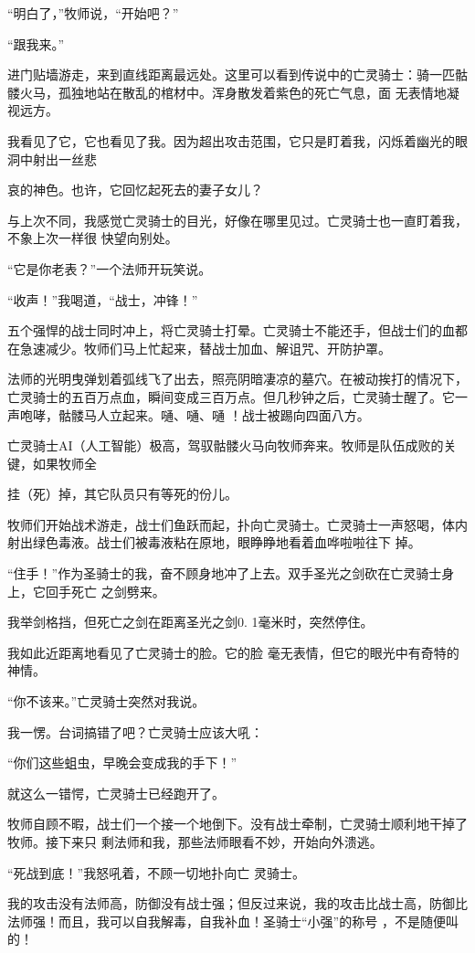 \documentclass{article}
\begin{document}
“明白了，”牧师说，“开始吧？” 


“跟我来。” 

进门贴墙游走，来到直线距离最远处。这里可以看到传说中的亡灵骑士：骑一匹骷髅火马，孤独地站在散乱的棺材中。浑身散发着紫色的死亡气息，面
无表情地凝视远方。 

我看见了它，它也看见了我。因为超出攻击范围，它只是盯着我，闪烁着幽光的眼洞中射出一丝悲

\newpage
哀的神色。也许，它回忆起死去的妻子女儿？ 

与上次不同，我感觉亡灵骑士的目光，好像在哪里见过。亡灵骑士也一直盯着我，不象上次一样很
快望向别处。 


“它是你老表？”一个法师开玩笑说。 


“收声！”我喝道，“战士，冲锋！” 

五个强悍的战士同时冲上，将亡灵骑士打晕。亡灵骑士不能还手，但战士们的血都在急速减少。牧师们马上忙起来，替战士加血、解诅咒、开防护罩。

法师的光明曳弹划着弧线飞了出去，照亮阴暗凄凉的墓穴。在被动挨打的情况下，亡灵骑士的五百万点血，瞬间变成三百万点。但几秒钟之后，亡灵骑士醒了。它一声咆哮，骷髅马人立起来。嗵、嗵、嗵
！战士被踢向四面八方。 

亡灵骑士AI（人工智能）极高，驾驭骷髅火马向牧师奔来。牧师是队伍成败的关键，如果牧师全
\newpage

挂（死）掉，其它队员只有等死的份儿。 

牧师们开始战术游走，战士们鱼跃而起，扑向亡灵骑士。亡灵骑士一声怒喝，体内射出绿色毒液。战士们被毒液粘在原地，眼睁睁地看着血哗啦啦往下
掉。 

“住手！”作为圣骑士的我，奋不顾身地冲了上去。双手圣光之剑砍在亡灵骑士身上，它回手死亡
之剑劈来。 

我举剑格挡，但死亡之剑在距离圣光之剑0.
1毫米时，突然停住。 

我如此近距离地看见了亡灵骑士的脸。它的脸
毫无表情，但它的眼光中有奇特的神情。 


“你不该来。”亡灵骑士突然对我说。 

我一愣。台词搞错了吧？亡灵骑士应该大吼：

\newpage
“你们这些蛆虫，早晚会变成我的手下！” 


就这么一错愕，亡灵骑士已经跑开了。 

牧师自顾不暇，战士们一个接一个地倒下。没有战士牵制，亡灵骑士顺利地干掉了牧师。接下来只
剩法师和我，那些法师眼看不妙，开始向外溃逃。 

“死战到底！”我怒吼着，不顾一切地扑向亡
灵骑士。 

我的攻击没有法师高，防御没有战士强；但反过来说，我的攻击比战士高，防御比法师强！而且，我可以自我解毒，自我补血！圣骑士“小强”的称号
，不是随便叫的！ 
\end{document}
